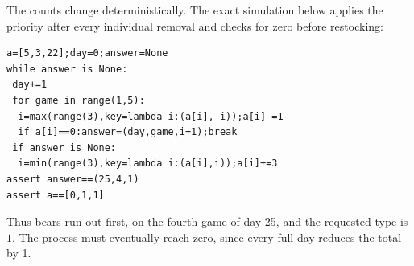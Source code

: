 The counts change deterministically. The exact simulation below applies the priority after every individual removal and checks for zero before restocking:
\begin{verbatim}
a=[5,3,22];day=0;answer=None
while answer is None:
 day+=1
 for game in range(1,5):
  i=max(range(3),key=lambda i:(a[i],-i));a[i]-=1
  if a[i]==0:answer=(day,game,i+1);break
 if answer is None:
  i=min(range(3),key=lambda i:(a[i],i));a[i]+=3
assert answer==(25,4,1)
assert a==[0,1,1]
\end{verbatim}
Thus bears run out first, on the fourth game of day 25, and the requested type is $\boxed1 $. The process must eventually reach zero, since every full day reduces the total by 1.
